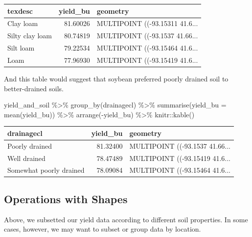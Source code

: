 \documentclass[
]{book}
\newenvironment{Shaded}{\begin{snugshade}}{\end{snugshade}}
\newcommand{\AttributeTok}[1]{\textcolor[rgb]{0.77,0.63,0.00}{#1}}
\newcommand{\FunctionTok}[1]{\textcolor[rgb]{0.00,0.00,0.00}{#1}}
\newcommand{\NormalTok}[1]{#1}
\newcommand{\SpecialCharTok}[1]{\textcolor[rgb]{0.00,0.00,0.00}{#1}}
\begin{document}
\begin{tabular}{l|r|l}
\hline
texdesc & yield\_bu & geometry\\
\hline
Clay loam & 81.60026 & MULTIPOINT ((-93.15311 41.6...\\
\hline
Silty clay loam & 80.74819 & MULTIPOINT ((-93.1537 41.66...\\
\hline
Silt loam & 79.22534 & MULTIPOINT ((-93.15464 41.6...\\
\hline
Loam & 77.96930 & MULTIPOINT ((-93.15419 41.6...\\
\hline
\end{tabular}

And this table would suggest that soybean preferred poorly drained soil to better-drained soils.

\begin{Shaded}
\begin{Highlighting}[]
\NormalTok{yield\_and\_soil }\SpecialCharTok{\%\textgreater{}\%}
  \FunctionTok{group\_by}\NormalTok{(drainagecl) }\SpecialCharTok{\%\textgreater{}\%}
  \FunctionTok{summarise}\NormalTok{(}\AttributeTok{yield\_bu =} \FunctionTok{mean}\NormalTok{(yield\_bu)) }\SpecialCharTok{\%\textgreater{}\%}
  \FunctionTok{arrange}\NormalTok{(}\SpecialCharTok{{-}}\NormalTok{yield\_bu) }\SpecialCharTok{\%\textgreater{}\%}
\NormalTok{  knitr}\SpecialCharTok{::}\FunctionTok{kable}\NormalTok{()}
\end{Highlighting}
\end{Shaded}

\begin{tabular}{l|r|l}
\hline
drainagecl & yield\_bu & geometry\\
\hline
Poorly drained & 81.32400 & MULTIPOINT ((-93.1537 41.66...\\
\hline
Well drained & 78.47489 & MULTIPOINT ((-93.15419 41.6...\\
\hline
Somewhat poorly drained & 78.09084 & MULTIPOINT ((-93.15464 41.6...\\
\hline
\end{tabular}

\hypertarget{operations-with-shapes}{%
\subsection{Operations with Shapes}\label{operations-with-shapes}}

Above, we subsetted our yield data according to different soil properties. In some cases, however, we may want to subset or group data by location.
\end{document}

